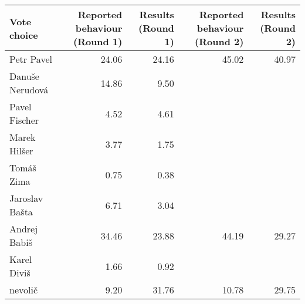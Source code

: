 
\begin{tabular}{l|r|r|r|r}
\hline
Vote choice & Reported behaviour (Round 1) & Results (Round 1) & Reported behaviour (Round 2) & Results (Round 2)\\
\hline
Petr Pavel & 24.06 & 24.16 & 45.02 & 40.97\\
\hline
Danuše Nerudová & 14.86 & 9.50 &  & \\
\hline
Pavel Fischer & 4.52 & 4.61 &  & \\
\hline
Marek Hilšer & 3.77 & 1.75 &  & \\
\hline
Tomáš Zima & 0.75 & 0.38 &  & \\
\hline
Jaroslav Bašta & 6.71 & 3.04 &  & \\
\hline
Andrej Babiš & 34.46 & 23.88 & 44.19 & 29.27\\
\hline
Karel Diviš & 1.66 & 0.92 &  & \\
\hline
nevolič & 9.20 & 31.76 & 10.78 & 29.75\\
\hline
\end{tabular}
